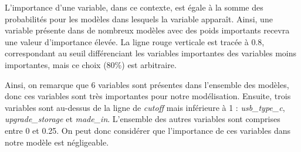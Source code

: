 \documentclass[
  12pt,
]{report}
\begin{document}
L'importance d'une variable, dans ce contexte, est égale à la somme des
probabilités pour les modèles dans lesquels la variable apparaît. Ainsi,
une variable présente dans de nombreux modèles avec des poids importants
recevra une valeur d'importance élevée. La ligne rouge verticale est
tracée à 0.8, correspondant au seuil différenciant les variables
importantes des variables moins importantes, mais ce choix (80\%) est
arbitraire.

Ainsi, on remarque que 6 variables sont présentes dans l'ensemble des
modèles, donc ces variables sont très importantes pour notre
modélisation. Ensuite, trois variables sont au-dessus de la ligne de
\emph{cutoff} mais inférieure à 1 : \emph{usb\_type\_c},
\emph{upgrade\_storage} et \emph{made\_in}. L'ensemble des autres
variables sont comprises entre 0 et 0.25. On peut donc considérer que
l'importance de ces variables dans notre modèle est négligeable.
\end{document}
